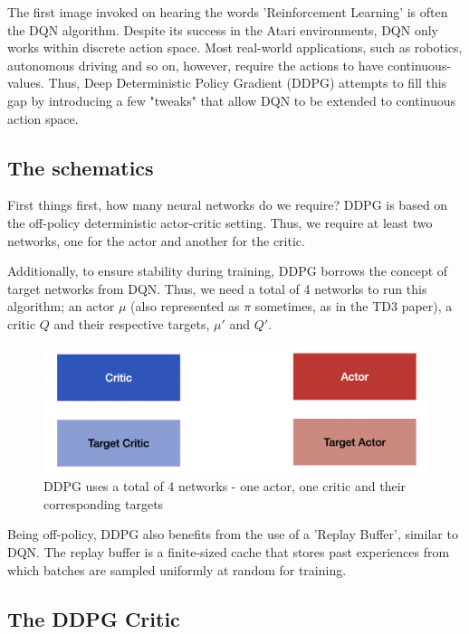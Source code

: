 The first image invoked on hearing the words 'Reinforcement Learning' is often 
the DQN algorithm. Despite its success in the Atari environments, DQN only works 
within discrete action space. Most real-world applications, such as robotics, 
autonomous driving and so on, however, require the actions to have continuous-values. 
Thus, Deep Deterministic Policy Gradient (DDPG) attempts to fill this gap by 
introducing a few "tweaks" that allow DQN to be extended to continuous action space.


\subsection{The schematics}

First things first, how many neural networks do we require? DDPG is based on 
the off-policy deterministic actor-critic setting. Thus, we require at least two 
networks, one for the actor and another for the critic.

Additionally, to ensure stability during training, DDPG borrows the concept of 
target networks from DQN. Thus, we need a total of 4 networks to run this algorithm; 
an actor $\mu$ (also represented as $\pi$ sometimes, as in the TD3 paper), a critic 
$Q$ and their respective targets, $\mu'$ and $Q'$.

\begin{figure}[h]
\centering
\includegraphics[scale=0.5]{pix/td3/ddpg_schematics.png}
\caption{DDPG uses a total of 4 networks - one actor, one critic and their 
corresponding targets}
\end{figure}

Being off-policy, DDPG also benefits from the use of a 'Replay Buffer', similar 
to DQN. The replay buffer is a finite-sized cache that stores past experiences 
from which batches are sampled uniformly at random for training.

\subsection{The DDPG Critic}

